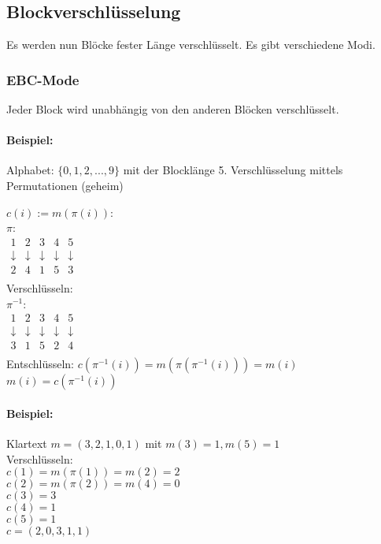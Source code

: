 \renewcommand{\ldate}{2015-06-01}	%

\subsection{Blockverschlüsselung}
Es werden nun Blöcke fester Länge verschlüsselt. Es gibt verschiedene Modi.

\subsubsection{EBC-Mode}Jeder Block wird unabhängig von den anderen Blöcken verschlüsselt. 




\paragraph{Beispiel:} Alphabet: $\{0,1,2,...,9\}$ mit der Blocklänge 5. Verschlüsselung mittels Permutationen (geheim)

$c(i):=m(\pi(i))$:\\
$\pi$:\\
$\begin{array}{cccccc}
1 & 2 & 3 & 4 & 5 \\ 
\downarrow & \downarrow & \downarrow & \downarrow & \downarrow \\ 
2 & 4 & 1 & 5 & 3 \\
\end{array}$ 
\\

Verschlüsseln:\\
$\pi^{-1}$:\\
$\begin{array}{cccccc}
1 & 2 & 3 & 4 & 5 \\ 
\downarrow & \downarrow & \downarrow & \downarrow & \downarrow \\ 
3 & 1 & 5 & 2 & 4 \\
\end{array}$ 
\\

Entschlüsseln: $c(\pi^{-1}(i)) = m(\pi(\pi^{-1}(i))) = m(i)$\\
$m(i)=c(\pi^{-1}(i))$\\

\paragraph{Beispiel:} Klartext $m=(3,2,1,0,1)$ mit $m(3)=1, m(5)=1$\\
Verschlüsseln:\\
$c(1)=m(\pi(1))=m(2)=2$\\
$c(2)=m(\pi(2))=m(4)=0$\\
$c(3)=3$\\
$c(4)=1$\\
$c(5)=1$\\
$c=(2,0,3,1,1)$

